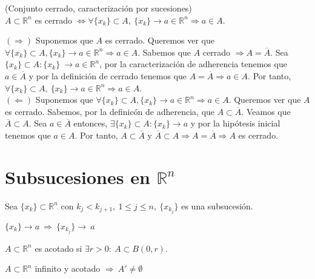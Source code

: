 \begin{prop}
(Conjunto cerrado, caracterización por sucesiones)\\
$ A \subset \mathbb{R}^n$ es cerrado $\Leftrightarrow \forall \{x_k\} \subset A, \ \{x_k\} \rightarrow a \in \mathbb{R}^n \Rightarrow a \in A$.
\end{prop}

\begin{dem}
 $(\Rightarrow)$ Suponemos que $A$ es cerrado. Queremos ver que $\forall \{x_k\} \subset A, \{x_k\} \rightarrow a \in \mathbb{R}^n \Rightarrow a \in A$. Sabemos que $A$ cerrado $\Rightarrow A = \overline{A}$. Sea $\{x_k\}\subset A:\{x_k\}\ \rightarrow a\in\mathbb{R}^n $, por la caracterización de adherencia tenemos que $a \in \overline{A}$ y por la definición de cerrado tenemos que $ A = \overline{A} \Rightarrow a\in A$.  Por tanto, $\forall \{x_k\} \subset A, \ \{x_k\} \rightarrow a \in \mathbb{R}^n \Rightarrow a \in A$.\\
 
\noindent $(\Leftarrow)$ Suponemos que $\forall \{x_k\} \subset A, \{x_k\} \rightarrow a \in \mathbb{R}^n \Rightarrow a \in A$. Queremos ver que $A$ es cerrado. Sabemos, por la definicón de adherencia, que $ A \subset \overline{A}$. Veamos que $\overline{A} \subset A$. Sea $a \in \overline{A}$ entonces, $\exists \{x_k\}\subset A: \{x_k\} \rightarrow a$ y por la hipótesis inicial tenemos que $a\in A$. Por tanto, $A \subset \overline{A}$ y $\overline{A} \subset A \Rightarrow A = \overline{A} \Rightarrow A$ es cerrado.
\end{dem}

\newpage
\section{Subsucesiones en $\mathbb{R}^n$}
\begin{defn}[Subsucesión]
Sea $\{x_k\} \subset \mathbb{R}^n$ con $ k_j < k_{j+1}, \ 1 \leq j \leq n, \ \{x_{k_j}\}$ es una subsucesión.
\end{defn}

\begin{obs}
 $\{x_k\} \rightarrow a  \ \Rightarrow \ \{x_{k_j}\} \rightarrow \ a $
\end{obs}

\begin{defn}
$ A \subset \mathbb{R}^n$ es acotado si $\exists r > 0: \ A \subset B(0,r)$.
\end{defn}

\begin{defn}
$ A \subset \mathbb{R}^n$ infinito y acotado $\Rightarrow \ A' \neq \emptyset$
\end{defn}

